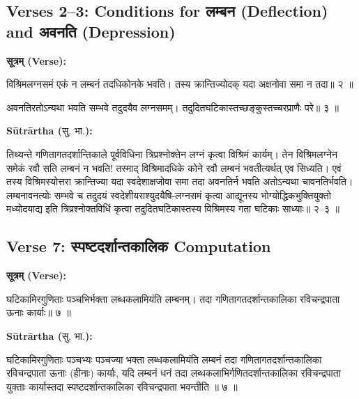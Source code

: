 \documentclass[11pt,a4paper]{article}
\newcommand{\dev}[1]{{\devanagarifont #1}}
\newcommand{\arth}{\textbf{Sūtrārtha (}\dev{सु. भा.}\textbf{):}\ }
\newenvironment{sanskritverse}{%
  \begin{center}\begin{minipage}{0.9\textwidth}
  \setlength{\leftskip}{1em}
  \setlength{\rightskip}{1em}
  \dev
}{\end{minipage}\end{center}}
\begin{document}
\subsection{Verses 2--3: Conditions for \dev{लम्बन} (Deflection) and \dev{अवनति} (Depression)}

\vspace{0.5em}
\noindent\textbf{\dev{सूत्रम् (Verse):}}
\begin{sanskritverse}
विश्रिमलग्नसमं एकं न लम्बनं तदधिकोनके भवति।
तस्य क्रान्तिज्योदक् यदा अक्षनोवा समा न तदा॥ २ ॥
\end{sanskritverse}

\begin{sanskritverse}
अवनतिरतोऽन्यथा भवति सम्भवे तदुदयैव लग्नसमम्।
तदुदितघटिकास्तच्छङ्कुस्तच्चरप्राणैः परे॥ ३ ॥
\end{sanskritverse}

\noindent\arth
\begin{sanskritverse}
तिथ्यन्ते गणितागतदर्शान्तिकाले पूर्वविधिना त्रिप्रश्नोक्तेन लग्नं कृत्वा विश्रिमं
कार्यम्। तेन विश्रिमलग्नेन समेकं रवौ सति लम्बनं न भवति! तस्माद् विश्रिमादधिके
कोने रवौ लम्बनं भवतीत्यर्थत् एव सिध्यति। एवं तस्य विश्रिमस्योत्तरा क्रान्तिज्या यदा
स्वदेशाक्षजोवा समा तदा अवनतिर्न भवति अतोऽन्यथा चावनतिर्भवति।
लम्बनावनत्योः सम्भवे च तदुदयं स्वदेशीयराश्युदयैषि-लग्नसमं कृत्वा
आद्यूनस्य भोग्योद्धिकभुक्तियुक्तो मध्योदयाद्य इति त्रिप्रश्नोक्तविधिं कृत्वा
तदुदितघटिकास्तस्य विश्रिमस्य गता घटिकाः साध्याः॥ २--३ ॥
\end{sanskritverse}

\subsection{Verse 7: \dev{स्पष्टदर्शान्तकालिक} Computation}

\vspace{0.5em}
\noindent\textbf{\dev{सूत्रम् (Verse):}}
\begin{sanskritverse}
घटिकामिरगुणिताः पञ्चभिर्भक्ता लब्धकलामियंति लम्बनम्।
तदा गणितागतदर्शान्तकालिका रविचन्द्रपाता ऊनाः कार्याः॥ ७ ॥
\end{sanskritverse}

\noindent\arth
\begin{sanskritverse}
घटिकामिरगुणिताः पञ्चभ्यः पञ्चज्या भक्ता लब्धकलामियंति लम्बनं तदा
गणितागतदर्शान्तकालिका रविचन्द्रपाता ऊनाः (हीनाः) कार्याः, यदि लम्बनं धनं तदा
लब्धकलाभिर्गणितदर्शान्तकालिका रविचन्द्रपाता युक्ताः कार्यास्तदा स्पष्टदर्शान्तकालिका
रविचन्द्रपाता भवन्तीति ॥ ७ ॥
\end{sanskritverse}
\end{document}
